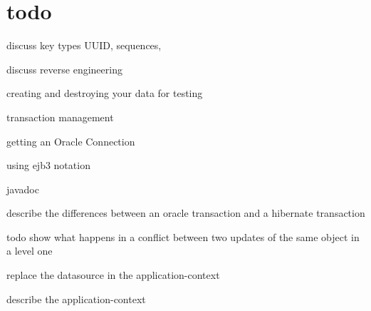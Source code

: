 \documentclass[letterpaper,10pt]{article}
\title{}
\author{Jim Schmidt}
\begin{document}
\maketitle
\section{todo}
discuss key types UUID, sequences, 

discuss reverse engineering 

creating and destroying your data for testing

transaction management 

getting an Oracle Connection

using ejb3 notation

javadoc

describe the differences between an oracle transaction and a hibernate transaction 

todo show what happens in a conflict between two updates of the same object in a level one

replace the datasource in the application-context

describe the application-context









\end{document}
